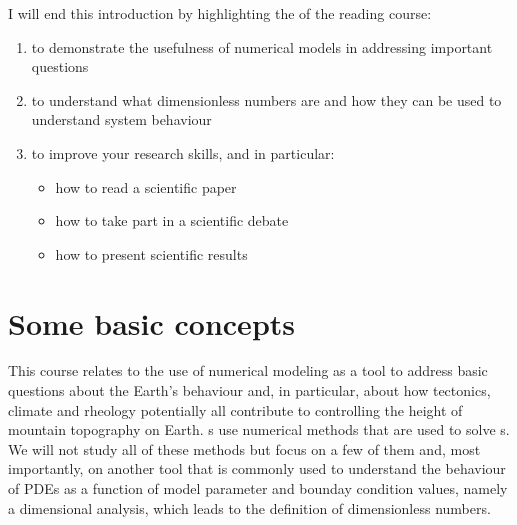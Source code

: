 \documentclass[letterpaper,10pt,english]{jupyterBook}
\begin{document}
\begin{DUlineblock}{0em}
\item[] 
\end{DUlineblock}

\sphinxAtStartPar
I will end this introduction by highlighting the  of the reading course:
\begin{enumerate}
%
\item {} 
\sphinxAtStartPar
to demonstrate the usefulness of numerical models in addressing important questions

\item {} 
\sphinxAtStartPar
to understand what dimensionless numbers are and how they can be used to understand system behaviour

\item {} 
\sphinxAtStartPar
to improve your research skills, and in particular:
\begin{itemize}
\item {} 
\sphinxAtStartPar
how to read a scientific paper

\item {} 
\sphinxAtStartPar
how to take part in a scientific debate

\item {} 
\sphinxAtStartPar
how to present scientific results

\end{itemize}

\end{enumerate}

\sphinxstepscope


\chapter{Some basic concepts}
\label{\detokenize{concepts:some-basic-concepts}}\label{\detokenize{concepts::doc}}
\sphinxAtStartPar
This course relates to the use of numerical modeling as a tool to address basic questions about the Earth’s behaviour and, in particular, about how tectonics, climate and rheology potentially all contribute to controlling the height of mountain topography on Earth. {\hyperref[\detokenize{glossary:term-Numerical-model}]{}}s use numerical methods that are used to solve {\hyperref[\detokenize{glossary:term-Partial-differential-equation}]{}}s. We will not study all of these methods but focus on a few of them and, most importantly, on another tool that is commonly used to understand the behaviour of PDEs as a function of model parameter and bounday condition values, namely a dimensional analysis, which leads to the definition of dimensionless numbers.
\end{document}
